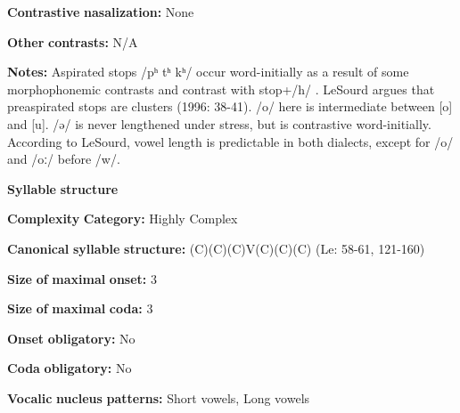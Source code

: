 \documentclass[output=paper]{langsci/langscibook}
\begin{document}
\begin{styleBody}
\textbf{Contrastive} \textbf{nasalization:} None
\end{styleBody}

\begin{styleBody}
\textbf{Other} \textbf{contrasts:} N/A
\end{styleBody}

\begin{styleBody}
\textbf{Notes:} Aspirated stops /pʰ tʰ kʰ/ occur word-initially as a result of some morphophonemic contrasts and contrast with stop+/h/ \citep{Sherwood1986}. LeSourd argues that preaspirated stops are clusters (1996: 38-41). /o/ here is intermediate between [o] and [u]. /ə/ is never lengthened under stress, but is contrastive word-initially. According to LeSourd, vowel length is predictable in both dialects, except for /o/ and /oː/ before /w/.
\end{styleBody}

\begin{styleBody}
\textbf{Syllable} \textbf{structure}
\end{styleBody}

\begin{styleBody}
\textbf{Complexity} \textbf{Category:} Highly Complex
\end{styleBody}

\begin{styleBody}
\textbf{Canonical} \textbf{syllable} \textbf{structure:} (C)(C)(C)V(C)(C)(C) (Le\citealt{Sourd1993}: 58-61, 121-160)
\end{styleBody}

\begin{styleBody}
\textbf{Size} \textbf{of} \textbf{maximal} \textbf{onset:} 3
\end{styleBody}

\begin{styleBody}
\textbf{Size} \textbf{of} \textbf{maximal} \textbf{coda:} 3
\end{styleBody}

\begin{styleBody}
\textbf{Onset} \textbf{obligatory:} No
\end{styleBody}

\begin{styleBody}
\textbf{Coda} \textbf{obligatory:} No
\end{styleBody}

\begin{styleBody}
\textbf{Vocalic} \textbf{nucleus} \textbf{patterns:} Short vowels, Long vowels
\end{styleBody}
\end{document}
